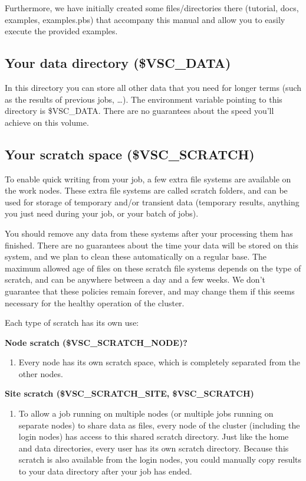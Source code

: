 Furthermore, we have initially created some files/directories there (tutorial, docs,  examples, examples.pbs) that accompany  this manual and allow you to easily execute the provided examples.

\subsection{Your data directory (\$VSC\_DATA)}

In this directory you can store all other data that you need for longer terms (such as the results of previous jobs, \ldots). The environment variable pointing to this directory is \$VSC\_DATA. There are no guarantees about the speed you'll achieve on this volume.

\subsection{Your scratch space (\$VSC\_SCRATCH)}

To enable quick writing from your job, a few extra file systems are available on the work nodes. These extra file systems are called scratch folders, and can be used for storage of temporary and/or transient data (temporary results, anything you just need during your job, or your batch of jobs).

You should remove any data from these systems after your processing them has finished. There are no guarantees about the time your data will be stored on this system, and we plan to clean these automatically on a regular base. The maximum allowed age of files on these scratch file systems depends on the type of scratch, and can be anywhere between a day and a few weeks. We don't guarantee that these policies remain forever, and may change them if this seems necessary for the healthy operation of the cluster.

Each type of scratch has its own use:

\textbf{Node scratch (\$VSC\_SCRATCH\_NODE)?}
\begin{enumerate}
\item \textbf{ }Every node has its own scratch space, which is completely separated from the other nodes.
\end{enumerate}

\textbf{Site scratch (\$VSC\_SCRATCH\_SITE, \$VSC\_SCRATCH)}
\begin{enumerate}
\item \textbf{ }To allow a job running on multiple nodes (or multiple jobs running on separate nodes) to share data as files, every node of the cluster (including the login nodes) has access to this shared scratch directory. Just like the home and data directories, every user has its own scratch directory. Because this scratch is also available from the login nodes, you could manually copy results to your data directory after your job has ended.
\end{enumerate}

